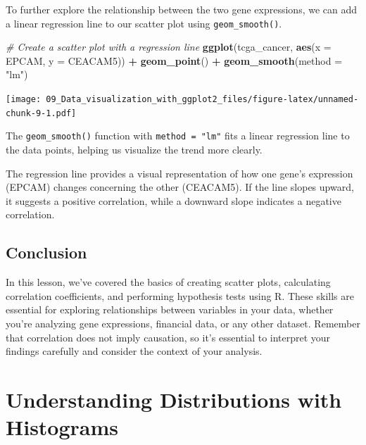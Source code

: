 \documentclass[
]{book}
\newenvironment{Shaded}{\begin{snugshade}}{\end{snugshade}}
\newcommand{\AttributeTok}[1]{\textcolor[rgb]{0.13,0.29,0.53}{#1}}
\newcommand{\CommentTok}[1]{\textcolor[rgb]{0.56,0.35,0.01}{\textit{#1}}}
\newcommand{\FunctionTok}[1]{\textcolor[rgb]{0.13,0.29,0.53}{\textbf{#1}}}
\newcommand{\NormalTok}[1]{#1}
\newcommand{\SpecialCharTok}[1]{\textcolor[rgb]{0.81,0.36,0.00}{\textbf{#1}}}
\newcommand{\StringTok}[1]{\textcolor[rgb]{0.31,0.60,0.02}{#1}}
\begin{document}
To further explore the relationship between the two gene expressions, we can add a linear regression line to our scatter plot using \texttt{geom\_smooth()}.

\begin{Shaded}
\begin{Highlighting}[]
\CommentTok{\# Create a scatter plot with a regression line}
\FunctionTok{ggplot}\NormalTok{(tcga\_cancer, }\FunctionTok{aes}\NormalTok{(}\AttributeTok{x =}\NormalTok{ EPCAM, }\AttributeTok{y =}\NormalTok{ CEACAM5)) }\SpecialCharTok{+}
  \FunctionTok{geom\_point}\NormalTok{() }\SpecialCharTok{+}
  \FunctionTok{geom\_smooth}\NormalTok{(}\AttributeTok{method =} \StringTok{"lm"}\NormalTok{)}
\end{Highlighting}
\end{Shaded}

\texttt{[image: 09\_Data\_visualization\_with\_ggplot2\_files/figure-latex/unnamed-chunk-9-1.pdf]}

The \texttt{geom\_smooth()} function with \texttt{method\ =\ "lm"} fits a linear regression line to the data points, helping us visualize the trend more clearly.

The regression line provides a visual representation of how one gene's expression (EPCAM) changes concerning the other (CEACAM5). If the line slopes upward, it suggests a positive correlation, while a downward slope indicates a negative correlation.

\hypertarget{conclusion-22}{%
\subsection{Conclusion}\label{conclusion-22}}

In this lesson, we've covered the basics of creating scatter plots, calculating correlation coefficients, and performing hypothesis tests using R. These skills are essential for exploring relationships between variables in your data, whether you're analyzing gene expressions, financial data, or any other dataset. Remember that correlation does not imply causation, so it's essential to interpret your findings carefully and consider the context of your analysis.

\hypertarget{understanding-distributions-with-histograms}{%
\section{Understanding Distributions with Histograms}\label{understanding-distributions-with-histograms}}
\end{document}
